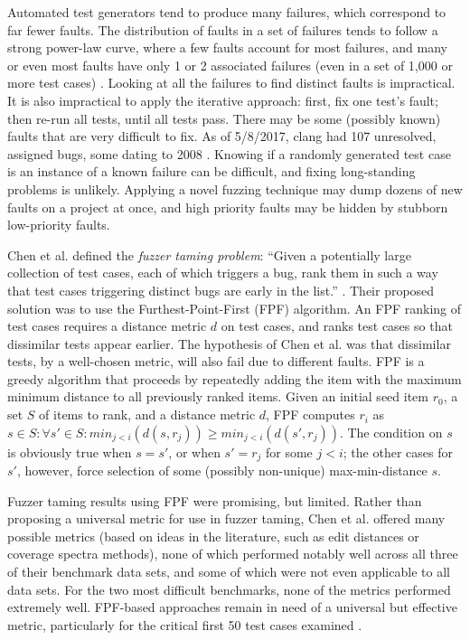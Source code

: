 Automated test generators tend to produce many failures, which correspond to far fewer faults.  The distribution of faults in a set of failures tends to follow a strong power-law curve, where a few faults account for most failures, and many or even most faults have only 1 or 2 associated failures (even in a set of 1,000 or more test cases) \cite{PLDI13,OneTest}.  Looking at all the failures to find  distinct faults is impractical.  It is also impractical to apply the iterative approach:  first, fix one test's fault; then re-run all tests, until all tests pass.  There may be some (possibly known) faults that are very difficult to fix. As of 5/8/2017, clang had 107 unresolved, assigned bugs, some dating to 2008 \cite{clangbugs}.  Knowing if a randomly generated test case is an instance of a known failure can be difficult, and fixing long-standing problems is unlikely.    Applying a novel fuzzing technique \cite{csmith,ISSTA12,ZhendongPLDI} may dump dozens of new faults on a project at once, and high priority faults may be hidden by stubborn low-priority faults.

Chen et al. defined the \emph{fuzzer taming problem}: ``Given a potentially large collection of test cases, each of which triggers a bug, rank them in such a way that test cases triggering distinct bugs are early in the list.'' \cite{PLDI13}.  Their proposed solution was to use the Furthest-Point-First \cite{Gonzalez} (FPF) algorithm.  An FPF ranking of test cases requires a distance metric $d$ on test cases, and ranks test cases so that dissimilar tests appear earlier.  The hypothesis of Chen et al. was that dissimilar tests, by a well-chosen metric, will also fail due to different faults.
FPF is a greedy algorithm that proceeds by repeatedly adding the item with the maximum minimum distance to all previously ranked items. Given an initial seed item $r_0$, a set
$S$ of items to rank, and a distance metric $d$, FPF computes $r_i$ as $s \in S: \forall s' \in S: min_{ j < i}(d(s,r_j)) \geq min_{j < i}(d(s',r_j))$.  The condition on $s$ is obviously true when $s = s'$, or when $s' = r_j$ for some $j < i$; the other cases for $s'$, however, force selection of some (possibly non-unique) max-min-distance $s$.

Fuzzer taming results using FPF were promising, but limited.  Rather than proposing a universal metric for use in fuzzer taming, Chen et al. offered many possible metrics (based on ideas in the literature, such as edit distances \cite{lev} or coverage spectra \cite{RepsSpectra} methods), none of which performed notably well across all three of their benchmark data sets, and some of which were not even applicable to all data sets.  For the two most difficult benchmarks, none of the metrics performed extremely well. FPF-based approaches remain in need of a universal but effective metric, particularly for the critical first 50 test cases examined \cite{PLDI13}.

